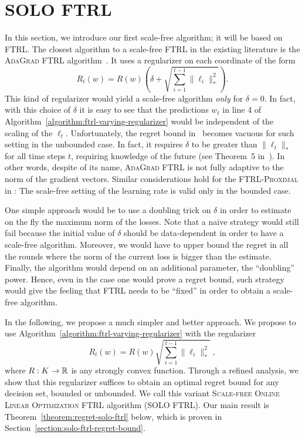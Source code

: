 \section{\textsc{SOLO FTRL}}
\label{section:solo-ftrl}

In this section, we introduce our first scale-free algorithm; it will be based
on \textsc{FTRL}. The closest algorithm to a scale-free \textsc{FTRL} in the
existing literature is the \textsc{AdaGrad FTRL}
algorithm~\cite{Duchi-Hazan-Singer-2011}. It uses a regularizer on each
coordinate of the form
\begin{equation*}
R_t(w) = R(w) \left(\delta + \sqrt{\sum_{i=1}^{t-1} \|\ell_i\|_*^2} \right).
\end{equation*}
This kind of regularizer would yield a scale-free algorithm \emph{only} for
$\delta=0$. In fact, with this choice of $\delta$ it is easy to see that the
predictions $w_t$ in line 4 of
Algorithm~\ref{algorithm:ftrl-varying-regularizer} would be independent of the
scaling of the $\ell_t$.  Unfortunately, the regret bound
in~\cite{Duchi-Hazan-Singer-2011} becomes vacuous for such setting in the
unbounded case. In fact, it requires $\delta$ to be greater than $\|\ell_t\|_*$
for all time steps $t$, requiring knowledge of the future (see Theorem~5
in~\cite{Duchi-Hazan-Singer-2011}). In other words, despite of its name,
\textsc{AdaGrad FTRL} is not fully adaptive to the norm of the gradient
vectors. Similar considerations hold for the \textsc{FTRL-Proximal} in
\cite{McMahan-Streeter-2010,McMahan-2014}: The scale-free setting of the
learning rate is valid only in the bounded case.

One simple approach would be to use a doubling trick on $\delta$ in order to
estimate on the fly the maximum norm of the losses. Note that a naive strategy
would still fail because the initial value of $\delta$ should be data-dependent
in order to have a scale-free algorithm. Moreover, we would have to upper bound
the regret in all the rounds where the norm of the current loss is bigger than
the estimate. Finally, the algorithm would depend on an additional parameter,
the ``doubling'' power. Hence, even in the case one would prove a regret bound,
such strategy would give the feeling that \textsc{FTRL} needs to be ``fixed''
in order to obtain a scale-free algorithm.

In the following, we propose a much simpler and better approach.  We propose to
use Algorithm~\ref{algorithm:ftrl-varying-regularizer} with the regularizer
\begin{equation}
\label{equation:solo-ftrl-regularizer}
R_t(w) = R(w) \sqrt{\sum_{i=1}^{t-1} \|\ell_i\|_*^2} \; ,
\end{equation}
where $R:K \to \mathbb{R}$ is any strongly convex function. Through a refined analysis,
we show that this regularizer suffices to obtain an optimal regret bound for any
decision set, bounded or unbounded.  We call this variant \textsc{Scale-free
Online Linear Optimization FTRL} algorithm (\textsc{SOLO FTRL}).  Our main
result is Theorem~\ref{theorem:regret-solo-ftrl} below, which is proven in
Section~\ref{section:solo-ftrl-regret-bound}.

